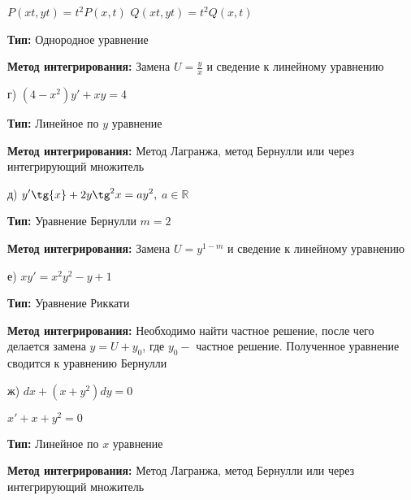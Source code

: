 \documentclass[a4paper]{article}
\begin{document}
$\displaystyle P(xt, yt)=t^2P(x, t)$ \hspace{0.7cm} $\displaystyle Q(xt, yt)=t^2Q(x, t)$

\vspace{0.3cm}

\textbf{Тип: } Однородное уравнение

\textbf{Метод интегрирования: } Замена $\displaystyle U=\frac{y}{x}$ и сведение к линейному уравнению

\vspace{1cm}

г) $\displaystyle (4-x^2)y'+xy=4$

\vspace{0.3cm}

\textbf{Тип: } Линейное по $y$ уравнение

\textbf{Метод интегрирования: } Метод Лагранжа, метод Бернулли или через интегрирующий множитель

\vspace{1cm}

д) $\displaystyle y'\tg{x}+2y\tg^2{x}=ay^2,$   $ a \in \mathbb{R}$

\vspace{0.3cm}

\textbf{Тип: } Уравнение Бернулли $m=2$

\textbf{Метод интегрирования: } Замена $U=y^{1-m}$ и сведение к линейному уравнению

\vspace{1cm}

е) $\displaystyle xy'=x^2y^2-y+1$

\vspace{0.3cm}

\textbf{Тип: } Уравнение Риккати

\textbf{Метод интегрирования: } Необходимо найти частное решение, после чего делается замена $\displaystyle y = U+y_0$, где $y_0-$ частное решение. Полученное уравнение сводится к уравнению Бернулли

\vspace{1cm}

ж) $\displaystyle dx+(x+y^2)dy=0$

\vspace{0.3cm}

$\displaystyle x'+x+y^2=0$

\vspace{0.3cm}

\textbf{Тип: } Линейное по $x$ уравнение

\textbf{Метод интегрирования: } Метод Лагранжа, метод Бернулли или через интегрирующий множитель
\end{document}
